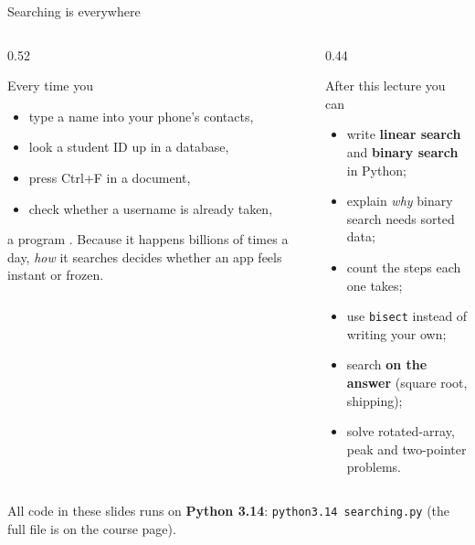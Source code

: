\documentclass[aspectratio=169,10pt]{beamer}
\begin{document}
\begin{frame}[plain]\titlepage\end{frame}

\begin{frame}{Searching is everywhere}
\begin{columns}[T]
\begin{column}{0.52\textwidth}
{\small
Every time you
\begin{itemize}\setlength\itemsep{2pt}
\item type a name into your phone's contacts,
\item look a student ID up in a database,
\item press Ctrl+F in a document,
\item check whether a username is already taken,
\end{itemize}
a program . Because it happens billions of times a day, \emph{how} it searches decides whether an app feels instant or frozen.}
\end{column}
\begin{column}{0.44\textwidth}
\begin{block}{After this lecture you can}
{\small
\begin{itemize}\setlength\itemsep{2pt}
\item write \textbf{linear search} and \textbf{binary search} in Python;
\item explain \emph{why} binary search needs sorted data;
\item count the steps each one takes;
\item use \texttt{bisect} instead of writing your own;
\item search \textbf{on the answer} (square root, shipping);
\item solve rotated-array, peak and two-pointer problems.
\end{itemize}}
\end{block}
\end{column}
\end{columns}
\vspace{2mm}
{\footnotesize All code in these slides runs on \textbf{Python 3.14}: \texttt{python3.14 searching.py} (the full file is on the course page).}
\end{frame}
\end{document}
